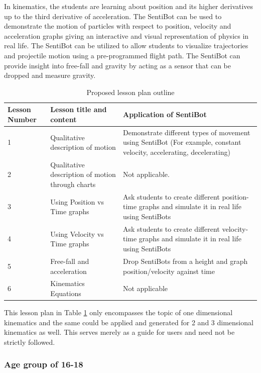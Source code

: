 \documentclass[12pt]{article}
\begin{document}
In kinematics, the students are learning about position and its higher derivatives up to the third derivative of acceleration. The SentiBot can be used to demonstrate the motion of particles with respect to position, velocity and acceleration graphs giving an interactive and visual representation of physics in real life.  The SentiBot can be utilized to allow students to visualize trajectories and projectile motion using a pre-programmed flight path. The SentiBot can provide insight into free-fall and gravity by acting as a sensor that can be dropped and measure gravity.

\begin{table}[h]
	\centering
	\begin{tabularx}{\linewidth}{ | >{\setlength\hsize{.2\hsize}} X | >{\setlength\hsize{.5\hsize}} X | X | }
		Lesson Number & Lesson title and content & Application of SentiBot \\
		\hline
		1 & Qualitative description of motion & Demonstrate different types of movement using SentiBot (For example, constant velocity, accelerating, decelerating) \\
		2 & Qualitative description of motion through charts & Not applicable. \\
		3 & Using Position vs Time graphs & Ask students to create different position-time graphs and simulate it in real life using SentiBots \\
		4 & Using Velocity vs Time graphs & Ask students to create different velocity-time graphs and simulate it in real life using SentiBots \\
		5 & Free-fall and acceleration & Drop SentiBots from a height and graph position/velocity against time \\
		6 & Kinematics Equations & Not applicable \\
	\end{tabularx}
	\caption{Proposed lesson plan outline}
	\label{tab:lessonplan}
\end{table}

This lesson plan in Table \ref{tab:lessonplan} only encompasses the topic of one dimensional kinematics and the same could be applied and generated for 2 and 3 dimensional kinematics as well. This serves merely as a guide for users and need not be strictly followed.

\subsubsection{Age group of 16-18}
\end{document}
